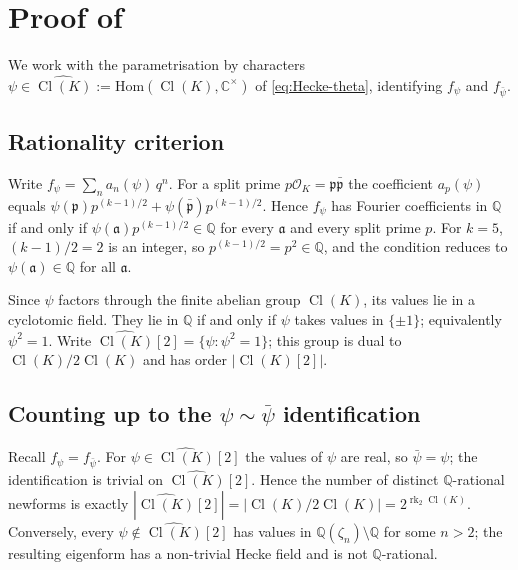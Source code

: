\documentclass[11pt]{amsart}
\theoremstyle{definition}
\theoremstyle{remark}
\DeclareMathOperator{\Cl}{Cl}
\DeclareMathOperator{\rk}{rk}
\newcommand{\Q}{\mathbb{Q}}
\newcommand{\C}{\mathbb{C}}
\newcommand{\OK}{\mathcal{O}_K}
\begin{document}
\section{Proof of \texorpdfstring{}{Theorem~1}}\label{sec:proof}

We work with the parametrisation by characters
\(\psi \in \widehat{\Cl(K)} := \mathrm{Hom}(\Cl(K), \C^\times)\) of
\eqref{eq:Hecke-theta}, identifying \(f_\psi\) and \(f_{\bar\psi}\).

\subsection{Rationality criterion}
Write \(f_\psi = \sum_n a_n(\psi)\, q^n\). For a split prime
\(p \OK = \mathfrak p \bar{\mathfrak p}\) the coefficient
\(a_p(\psi)\) equals
\(\psi(\mathfrak p) p^{(k-1)/2} + \psi(\bar{\mathfrak p}) p^{(k-1)/2}\).
Hence \(f_\psi\) has Fourier coefficients in \(\Q\) if and only if
\(\psi(\mathfrak a) p^{(k-1)/2} \in \Q\) for every \(\mathfrak a\)
and every split prime \(p\). For \(k=5\), \((k-1)/2 = 2\) is an
integer, so \(p^{(k-1)/2} = p^2 \in \Q\), and the condition reduces to
\(\psi(\mathfrak a) \in \Q\) for all \(\mathfrak a\).

Since \(\psi\) factors through the finite abelian group \(\Cl(K)\), its
values lie in a cyclotomic field. They lie in \(\Q\) if and only if
\(\psi\) takes values in \(\{\pm 1\}\); equivalently \(\psi^2 = 1\).
Write \(\widehat{\Cl(K)}[2] = \{\psi : \psi^2 = 1\}\); this group is
dual to \(\Cl(K) / 2\Cl(K)\) and has order \(|\Cl(K)[2]|\).

\subsection{Counting up to the \(\psi \sim \bar\psi\) identification}
Recall \(f_\psi = f_{\bar\psi}\). For
\(\psi \in \widehat{\Cl(K)}[2]\) the values of \(\psi\) are real, so
\(\bar\psi = \psi\); the identification is trivial on
\(\widehat{\Cl(K)}[2]\). Hence the number of distinct
\(\Q\)-rational newforms is exactly
\(|\widehat{\Cl(K)}[2]| = |\Cl(K)/2\Cl(K)| = 2^{\rk_2 \Cl(K)}\).
Conversely, every \(\psi \notin \widehat{\Cl(K)}[2]\) has values in
\(\Q(\zeta_n) \setminus \Q\) for some \(n > 2\); the resulting
eigenform has a non-trivial Hecke field and is not \(\Q\)-rational.
\end{document}
